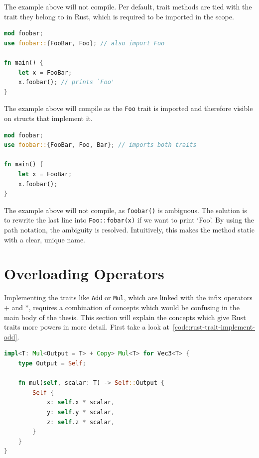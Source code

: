 \documentclass[11pt,
               a4paper,
               bibtotoc,
               idxtotoc,
               headsepline,
               footsepline,
               footexclude,
               BCOR12mm,
               DIV13,
               openany,   %
               ]
               {scrbook}
\begin{document}
The example above will not compile. Per default, trait methods are tied with the trait they belong to in Rust, which is required to be imported in the scope.

\vspace{0.5em}
\begin{lstlisting}[style=eclipse-rust, language=Rust, basicstyle=\ttfamily\small]
mod foobar; 
use foobar::{FooBar, Foo}; // also import Foo

fn main() {
    let x = FooBar;
    x.foobar(); // prints `Foo'
}
\end{lstlisting}

The example above will compile as the \texttt{Foo} trait is imported and therefore visible on structs that implement it.

\vspace{0.5em}
\begin{lstlisting}[style=eclipse-rust, language=Rust, basicstyle=\ttfamily\small]
mod foobar; 
use foobar::{FooBar, Foo, Bar}; // imports both traits

fn main() {
    let x = FooBar;
    x.foobar();
}
\end{lstlisting}

The example above will not compile, as \texttt{foobar()} is ambiguous. The solution is to rewrite the last line into \texttt{Foo::fobar(x)} if we want to print `Foo'. By using the path notation, the ambiguity is resolved. Intuitively, this makes the method static with a clear, unique name.

\section{Overloading Operators}\label{section:rust-implement-add-appendix}

Implementing the traits like \texttt{Add} or \texttt{Mul}, which are linked with the infix operators $+$ and $*$, requires a combination of concepts which would be confusing in the main body of the thesis. This section will explain the concepts which give Rust traits more powers in more detail. First take a look at~\autoref{code:rust-trait-implement-add}.

\vspace{0.5em}
\begin{lstlisting}[style=eclipse-rust, language=Rust, basicstyle=\ttfamily\small, caption={A Trait definition in Rust (Do not be confused that there is no \texttt{return} keyword: The last line is considered the return value if it is not followed by a semicolon)}, label=code:rust-trait-implement-add]
impl<T: Mul<Output = T> + Copy> Mul<T> for Vec3<T> {
    type Output = Self;

    fn mul(self, scalar: T) -> Self::Output {
        Self {
            x: self.x * scalar,
            y: self.y * scalar,
            z: self.z * scalar,
        }
    }
}
\end{lstlisting}
\end{document}
